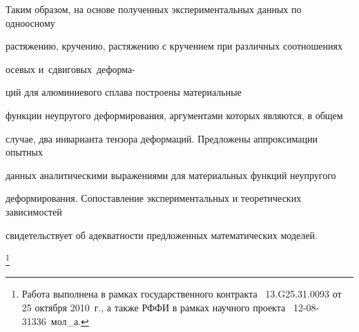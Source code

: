 Таким образом, на основе полученных экспериментальных данных по одноосному

растяжению, кручению, растяжению с кручением при различных соотношениях

осевых \mbox{и сдвиговых деформа-}



\pagebreak

\noindent ций для алюминиевого сплава построены материальные

функции неупругого деформирования, аргументами которых являются, в общем

случае, два инварианта тензора деформаций. Предложены аппроксимации опытных

данных аналитическими выражениями для материальных функций неупругого

деформирования. Сопоставление экспериментальных и теоретических зависимостей

свидетельствует об адекватности предложенных математических моделей.









\thanks{Работа выполнена в рамках государственного контракта \No~13.G25.31.0093 от 25 октября 2010~г., а также РФФИ в рамках научного проекта \No~12-08-31336~мол{\_}а.}




